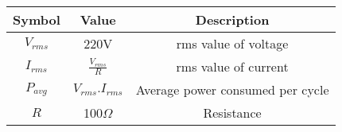 \begin{tabular}{|c|c|c|}
    \hline
   Symbol&Value&Description\\ \hline
   $V_{rms}$&220V&rms value of voltage\\ \hline
   $I_{rms}$&$\frac{V_{rms}}{R}$&rms value of current\\ \hline
   $P_{avg}$&$V_{rms} .I_{rms}$&Average power consumed per cycle\\ \hline
   $R$&100$\Omega$&Resistance \\\hline
    \end{tabular}
    
